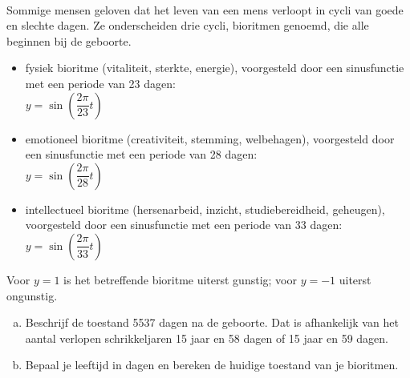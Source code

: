 \documentclass[a4paper,12pt]{article}
\begin{document}
\begin{oefening}\\
Sommige mensen geloven dat het leven van een mens verloopt in cycli van goede en slechte dagen. Ze onderscheiden drie cycli, bioritmen genoemd, die alle beginnen bij de geboorte.
\begin{itemize}
  \item fysiek bioritme (vitaliteit, sterkte, energie), voorgesteld door een sinusfunctie met een periode van 23 dagen:\\
    $y=\sin\left(\dfrac{2\pi}{23}t\right)$
   \item emotioneel bioritme (creativiteit, stemming, welbehagen), voorgesteld door een sinusfunctie met een periode van 28 dagen:\\
    $y=\sin\left(\dfrac{2\pi}{28}t\right)$ 
   \item intellectueel bioritme (hersenarbeid, inzicht, studiebereidheid, geheugen), voorgesteld door een sinusfunctie met een periode van 33 dagen:\\
    $y=\sin\left(\dfrac{2\pi}{33}t\right)$ 
\end{itemize}
Voor $y=1$ is het betreffende bioritme uiterst gunstig; voor $y=-1$ uiterst ongunstig.\\
\begin{enumerate}[(a)]
  \item Beschrijf de toestand 5537 dagen na de geboorte. Dat is afhankelijk van het aantal verlopen schrikkeljaren 15 jaar en 58 dagen of 15 jaar en 59 dagen.
  \item Bepaal je leeftijd in dagen en bereken de huidige toestand van je bioritmen.
\end{enumerate}
\end{oefening}



\end{document}
